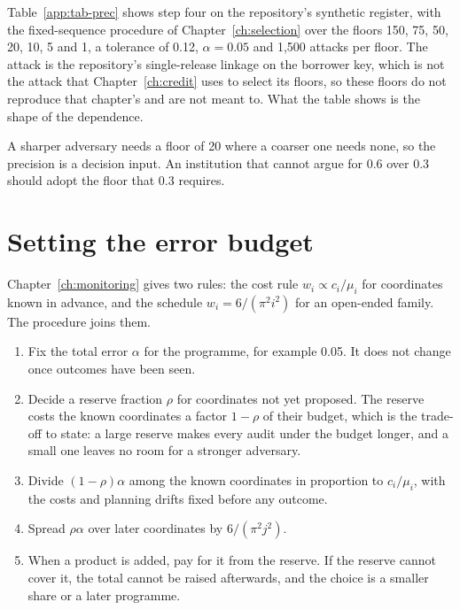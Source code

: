 Table~\ref{app:tab-prec} shows step four on the repository's synthetic register, with the
fixed-sequence procedure of Chapter~\ref{ch:selection} over the floors 150, 75, 50, 20, 10, 5
and 1, a tolerance of 0.12, $\alpha = 0.05$ and 1,500 attacks per floor. The attack is the
repository's single-release linkage on the borrower key, which is not the attack that
Chapter~\ref{ch:credit} uses to select its floors, so these floors do not reproduce that
chapter's and are not meant to. What the table shows is the shape of the dependence.

\begin{table}[t]
\centering
\caption{Exact upper bounds at each floor and the floor the fixed sequence selects, by
reading precision. Synthetic register of 32,581 loans; 1,500 attacks per cell; seed from
\texttt{configs/paper.json}. A dash means the sequence had stopped.}\label{app:tab-prec}
\small

\end{table}

A sharper adversary needs a floor of 20 where a coarser one needs none, so the precision is
a decision input. An institution that cannot argue for 0.6 over 0.3 should adopt the floor
that 0.3 requires.

\section{Setting the error budget}\label{app:b-budget}

Chapter~\ref{ch:monitoring} gives two rules: the cost rule $w_i \propto c_i/\mu_i$ for
coordinates known in advance, and the schedule $w_i = 6/(\pi^2 i^2)$ for an open-ended
family. The procedure joins them.

\begin{enumerate}
\item Fix the total error $\alpha$ for the programme, for example 0.05. It does not change
once outcomes have been seen.
\item Decide a reserve fraction $\rho$ for coordinates not yet proposed. The reserve costs the
known coordinates a factor $1-\rho$ of their budget, which is the trade-off to state: a large
reserve makes every audit under the budget longer, and a small one leaves no room for a
stronger adversary.
\item Divide $(1-\rho)\alpha$ among the known coordinates in proportion to $c_i/\mu_i$, with
the costs and planning drifts fixed before any outcome.
\item Spread $\rho\alpha$ over later coordinates by $6/(\pi^2 j^2)$.
\item When a product is added, pay for it from the reserve. If the reserve cannot cover it,
the total cannot be raised afterwards, and the choice is a smaller share or a later
programme.
\end{enumerate}

